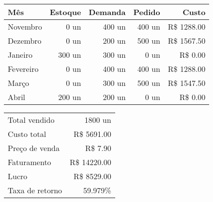 
	\begin{table}[ht]
		\centering
		\begin{tabular}{lrrrr}
			\toprule
			Mês       & Estoque & Demanda & Pedido &       Custo \\
			\midrule
			Novembro  &    0 un &  400 un & 400 un & R\$ 1288.00 \\
			Dezembro  &    0 un &  200 un & 500 un & R\$ 1567.50 \\
			Janeiro   &  300 un &  300 un &   0 un & R\$    0.00 \\
			Fevereiro &    0 un &  400 un & 400 un & R\$ 1288.00 \\
			Março     &    0 un &  300 un & 500 un & R\$ 1547.50 \\
			Abril     &  200 un &  200 un &   0 un & R\$    0.00 \\
			\bottomrule
		\end{tabular}
	\end{table}

	\begin{table}[ht]
		\centering
		\begin{tabular}{lr}
			\toprule
			Total vendido   &      1800 un    \\
			Custo total     & R\$  5691.00    \\
			Preço de venda  & R\$     7.90    \\
			Faturamento     & R\$ 14220.00    \\
			Lucro           & R\$  8529.00    \\
			Taxa de retorno &        59.979\% \\
			\bottomrule
		\end{tabular}
	\end{table}

